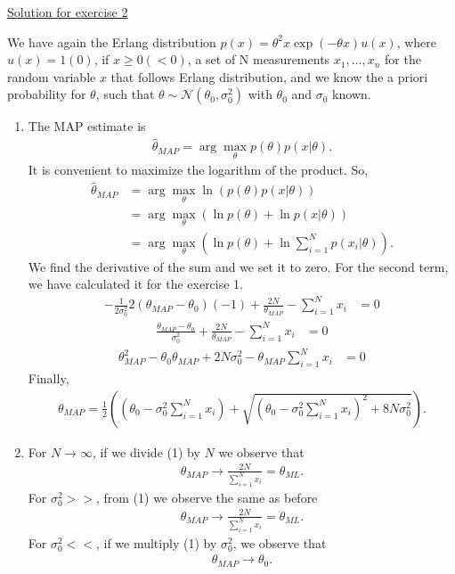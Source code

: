 \documentclass[12pt]{book}
\begin{document}
\newpage

{\underline{\large Solution for exercise 2}}
\vspace{0.3 cm}

We have again the Erlang distribution $p(x) = \theta^2 x \exp(-\theta x) u(x)$, where $u(x)=1(0)$, if $x\geq 0(< 0)$, a set of N measurements $x_1,\dots,x_n$ for the random variable $x$ that follows Erlang distribution, and we know the a priori probability for $\theta$, such that $\theta\sim \mathcal{N}(\theta_0,\sigma_0^2)$ with $\theta_0$ and $\sigma_0$ known.

\begin{enumerate}[label=(\alph*)]
\item The MAP estimate is
\begin{align*}
\hat{\theta}_{MAP} = \arg\max_{\theta}p(\theta)p(x|\theta).
\end{align*}
It is convenient to maximize the logarithm of the product. So,
\begin{align*}
\hat{\theta}_{MAP} &= \arg\max_{\theta}\ln \left(p(\theta)p(x|\theta)\right) \\ &= \arg\max_{\theta}\left(\ln p(\theta) + \ln p(x|\theta)\right) \\ &= \arg\max_{\theta}\left(\ln p(\theta) + \ln \sum_{i=1}^{N} p(x_i|\theta)\right).
\end{align*}
We find the derivative of the sum and we set it to zero. For the second term, we have calculated it for the exercise 1.
\begin{align*}
-\frac{1}{2\sigma_0^2}2(\theta_{MAP}-\theta_0)(-1) + \frac{2N}{\theta_{MAP}} - \sum_{i=1}^{N} x_i &= 0 
\end{align*}
\begin{align}
\frac{\theta_{MAP}-\theta_0}{\sigma_0^2}+ \frac{2N}{\theta_{MAP}} - \sum_{i=1}^{N} x_i &= 0
\end{align}
\begin{align*}
\theta_{MAP}^2  - \theta_0\theta_{MAP} + 2N\sigma_0^2 - \theta_{MAP} \sum_{i=1}^{N} x_i &= 0
\end{align*}
Finally,  
\begin{align*}
\theta_{MAP} = \frac{1}{2} \left((\theta_0-\sigma_0^2\sum_{i=1}^{N}x_i) + \sqrt{(\theta_0-\sigma_0^2\sum_{i=1}^{N}x_i)^2 + 8N\sigma_0^2}\right).
\end{align*}
\item For $N \rightarrow \infty$, if we divide (1) by $N$ we observe that
\begin{align*}
\theta_{MAP} \rightarrow \frac{2N}{\sum_{i=1}^{N} x_i} = \theta_{ML}.
\end{align*}
For $\sigma_0^2 >>$, from (1) we observe the same as before
\begin{align*}
\theta_{MAP} \rightarrow \frac{2N}{\sum_{i=1}^{N} x_i} = \theta_{ML}.
\end{align*}
For $\sigma_0^2 <<$, if we multiply (1) by $\sigma_0^2$, we observe that
\begin{align*}
\theta_{MAP} \rightarrow \theta_0.
\end{align*}
\end{enumerate}
\end{document}
